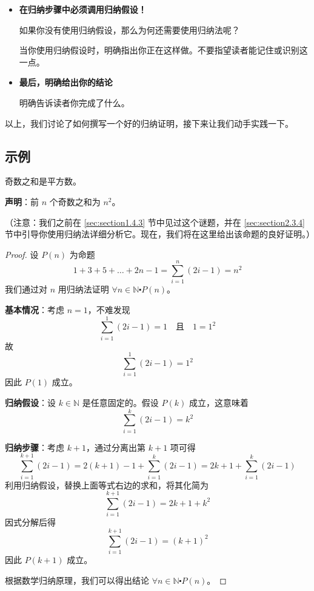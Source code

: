 \begin{itemize}
    \item \textbf{在归纳步骤中必须调用归纳假设！}
    
    如果你没有使用归纳假设，那么为何还需要使用归纳法呢？

    当你使用归纳假设时，明确指出你正在这样做。不要指望读者能记住或识别这一点。

    \item \textbf{最后，明确给出你的结论}
    
    明确告诉读者你完成了什么。\\
\end{itemize}

以上，我们讨论了如何撰写一个好的归纳证明，接下来让我们动手实践一下。

\subsection{示例}

\begin{example}
    奇数之和是平方数。

    \textbf{声明}：前 $n$ 个奇数之和为 $n^2$。

    （注意：我们之前在 \ref{sec:section1.4.3} 节中见过这个谜题，并在 \ref{sec:section2.3.4} 节中引导你使用归纳法详细分析它。现在，我们将在这里给出该命题的良好证明。）
\end{example}

\begin{proof}
    设 $P(n)$ 为命题
    \[1+3+5+ \dots +2n-1 = \sum_{i=1}^n (2i-1) = n^2\]
    我们通过对 $n$ 用归纳法证明 $\forall n \in \mathbb{N} \centerdot P(n)$。

    \textbf{基本情况}：考虑 $n=1$，不难发现
    \[\sum_{i=1}^1 (2i-1) = 1 \quad \text{且} \quad 1=1^2\]
    故
    \[\sum_{i=1}^1 (2i-1) = 1^2\]
    因此 $P(1)$ 成立。

    \textbf{归纳假设}：设 $k \in \mathbb{N}$ 是任意固定的。假设 $P(k)$ 成立，这意味着
    \[\sum_{i=1}^k (2i-1) = k^2\]

    \textbf{归纳步骤}：考虑 $k+1$，通过分离出第 $k+1$ 项可得
    \[\sum_{i=1}^{k+1} (2i-1) = 2(k + 1) - 1 + \sum_{i=1}^k (2i-1) = 2k + 1 + \sum_{i=1}^k (2i-1)\]
    利用归纳假设，替换上面等式右边的求和，将其化简为
    \[\sum_{i=1}^{k+1} (2i-1) = 2k+1+k^2\]
    因式分解后得
    \[\sum_{i=1}^{k+1} (2i-1) = (k+1)^2\]
    因此 $P(k+1)$ 成立。

    根据数学归纳原理，我们可以得出结论 $\forall n \in \mathbb{N} \centerdot P(n)$。
\end{proof}


